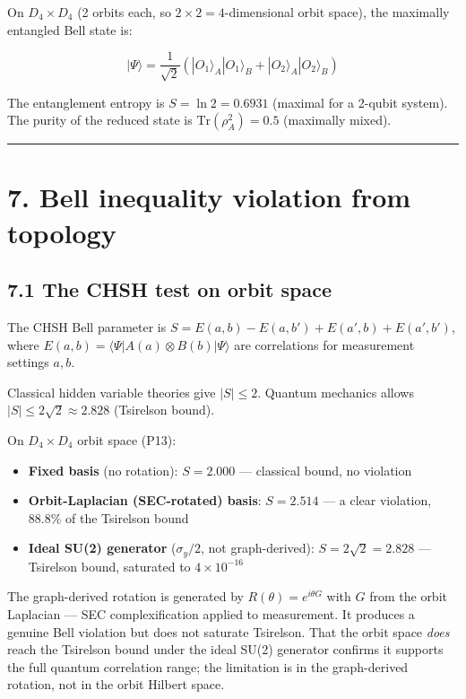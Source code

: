 \documentclass[11pt,a4paper]{article}
\providecommand{\tightlist}{\setlength{\itemsep}{0pt}\setlength{\parskip}{0pt}}
\begin{document}
On $D_4 \times D_4$ (2 orbits each, so $2 \times 2 = 4$-dimensional orbit space), the maximally entangled Bell state is:

\[|\Psi\rangle = \frac{1}{\sqrt{2}}(|O_1\rangle_A |O_1\rangle_B + |O_2\rangle_A |O_2\rangle_B)\]

The entanglement entropy is $S = \ln 2 = 0.6931$ (maximal for a 2-qubit system). The purity of the reduced state is $\text{Tr}(\rho_A^2) = 0.5$ (maximally mixed).

\begin{center}\rule{0.5\linewidth}{0.4pt}\end{center}

\section*{7. Bell inequality violation from topology}

\subsection*{7.1 The CHSH test on orbit space}

The CHSH Bell parameter is $S = E(a,b) - E(a,b') + E(a',b) + E(a',b')$, where $E(a,b) = \langle \Psi | A(a) \otimes B(b) | \Psi \rangle$ are correlations for measurement settings $a, b$.

Classical hidden variable theories give $|S| \leq 2$. Quantum mechanics allows $|S| \leq 2\sqrt{2} \approx 2.828$ (Tsirelson bound).

On $D_4 \times D_4$ orbit space (P13):
\begin{itemize}\tightlist
\item \textbf{Fixed basis} (no rotation): $S = 2.000$ — classical bound, no violation
\item \textbf{Orbit-Laplacian (SEC-rotated) basis}: $S = 2.514$ — a clear violation, 88.8\% of the Tsirelson bound
\item \textbf{Ideal SU(2) generator} ($\sigma_y/2$, not graph-derived): $S = 2\sqrt{2} = 2.828$ — Tsirelson bound, saturated to $4 \times 10^{-16}$
\end{itemize}

The graph-derived rotation is generated by $R(\theta) = e^{i\theta G}$ with $G$ from the orbit Laplacian — SEC complexification applied to measurement. It produces a genuine Bell violation but does not saturate Tsirelson. That the orbit space \emph{does} reach the Tsirelson bound under the ideal SU(2) generator confirms it supports the full quantum correlation range; the limitation is in the graph-derived rotation, not in the orbit Hilbert space.
\end{document}
